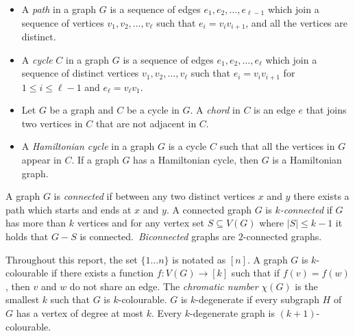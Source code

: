 \begin{itemize}
	\item A \textit{path} in a graph \(G\) is a sequence of edges \(e_1, e_2, \ldots, e_{\ell- 1}\) which join a sequence of vertices \(v_1, v_2, \ldots, v_{\ell}\) such that \(e_i = v_i v_{i + 1}\), and all the vertices are distinct.
	\item A \textit{cycle} \(C\) in a graph \(G\) is a sequence of edges \(e_1, e_2, \ldots, e_{\ell}\) which join a sequence of distinct vertices \(v_1, v_2, \ldots, v_{\ell}\) such that \(e_i = v_i v_{i + 1}\) for \(1 \leq i \leq \ell - 1\) and \(e_\ell = v_\ell v_1\).
	\item Let $G$ be a graph and $C$ be a cycle in $G$. A \textit{chord} in $C$ is an edge $e$ that joins two vertices in $C$ that are not adjacent in $C$. 
	\item A \textit{Hamiltonian cycle} in a graph \(G\) is a cycle \(C\) such that all the vertices in \(G\) appear in \(C\). If a graph $G$ has a Hamiltonian cycle, then $G$ is a Hamiltonian graph. 
\end{itemize}

A graph $G$ is \textit{connected} if between any two distinct vertices $x$ and $y$ there exists a path which starts and ends at $x$ and $y$. 
A connected graph \(G\) is \textit{\(k\)-connected} if \(G\) has more than \(k\) vertices and for any vertex set $S \subseteq V(G)$ where $|S| \leq k - 1$ it holds that $G - S$ is connected.\ \textit{Biconnected} graphs are $2$-connected graphs. 

Throughout this report, the set $\lbrace 1\ldots n \rbrace$ is notated as $[n]$. 
A graph \(G\) is \(k\)-colourable if there exists a function \(f: V(G) \rightarrow [k]\) such that if $f(v) = f(w)$, then $v$ and $w$ do not share an edge. The \textit{chromatic number} \(\chi(G)\) is the smallest \(k\) such that \(G\) is \(k\)-colourable.
$G$ is $k$-degenerate if every subgraph $H$ of $G$ has a vertex of degree at most $k$. Every $k$-degenerate graph is $(k + 1)$-colourable. 

